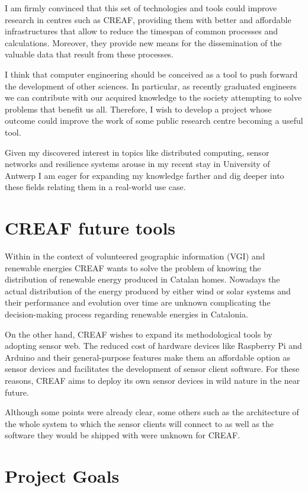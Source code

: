 I am firmly convinced that this set of technologies and tools could improve research in centres such as CREAF, providing them with better and affordable infrastructures that allow to reduce the timespan of common processes and calculations. Moreover, they provide new means for the dissemination of the valuable data that result from these processes.

I think that computer engineering should be conceived as a tool to push forward the development of other sciences. In particular, as recently graduated engineers we can contribute with our acquired knowledge to the society attempting to solve problems that benefit us all. Therefore, I wish to develop a project whose outcome could improve the work of some public research centre becoming a useful tool.

Given my discovered interest in topics like distributed computing, sensor networks and resilience systems arouse in my recent stay in University of Antwerp I am eager for expanding my knowledge farther and dig deeper into these fields relating them in a real-world use case.

\section{CREAF future tools}

Within in the context of volunteered geographic information (VGI) and renewable energies CREAF wants to solve the problem of knowing the distribution of renewable energy produced in Catalan homes. Nowadays the actual distribution of the energy produced by either wind or solar systems and their performance and evolution over time are unknown complicating the decision-making process regarding renewable energies in Catalonia.

On the other hand, CREAF wishes to expand its methodological tools by adopting sensor web. The reduced cost of hardware devices like Raspberry Pi and Arduino  and their general-purpose features make them an affordable option as sensor devices and facilitates the development of sensor client software. For these reasons, CREAF aims to deploy its own sensor devices in wild nature in the near future. 

Although some points were already clear, some others such as the architecture of the whole system to which the sensor clients will connect to as well as the software they would be shipped with were unknown for CREAF.

\section{Project Goals}

